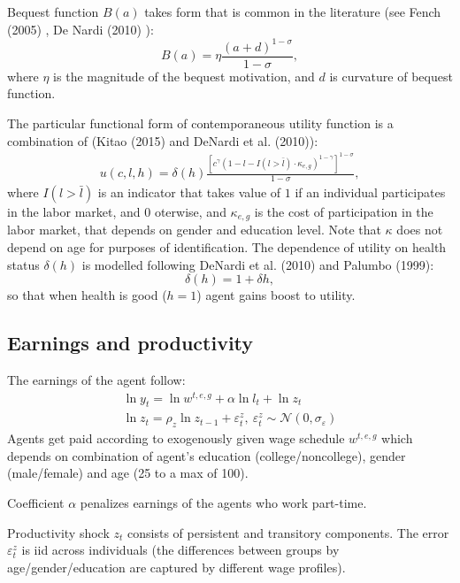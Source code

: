 \documentclass[
10pt, %
a4paper, %
oneside, %
headinclude,footinclude, %
BCOR5mm, %
]{scrartcl}
\begin{document}
Bequest function $B(a)$ takes form that is common in the literature (see Fench (2005) \cite{French2005}, De Nardi (2010) \cite{DeNardi2010}):
\begin{equation}
B(a) = \eta\frac{(a+d)^{1-\sigma}}{1-\sigma},
\end{equation}
where $\eta$ is the magnitude of the bequest motivation, and $d$ is curvature of bequest function.

The particular functional form of contemporaneous utility function  is a combination of (Kitao (2015)\cite{Kitao2015} and DeNardi et al. (2010)\cite{DeNardi2010}):
\begin{eqnarray*}
u(c,l,h) = \delta(h)\frac{[c^{\gamma}(1-l-I(l>\bar{l})\cdot \kappa_{e,g})^{1-\gamma}]^{1-\sigma}}{1-\sigma},
\end{eqnarray*}
where $I(l>\bar{l})$ is an indicator that takes value of $1$ if an individual participates in the labor market, and $0$ oterwise, and $\kappa_{e,g}$ is the cost of participation in the labor market, that depends on gender and education level. Note that $\kappa$ does not depend on age for purposes of identification. The dependence of utility on health status  $\delta(h)$ is modelled following DeNardi et al. (2010)\cite{DeNardi2010} and Palumbo (1999)\cite{Palumbo1999}:
\begin{equation*}
\delta(h) = 1+\delta h,
\end{equation*}
so that when health is good ($h=1$) agent gains boost to utility.

\subsection{Earnings and productivity}
The earnings of the agent follow:
\begin{eqnarray*}
\ln y_t = \ln w^{t,e,g}+\alpha \ln l_t + \ln z_t \\
\ln z_t = \rho_z \ln z_{t-1} +  \varepsilon_t^z, \ \varepsilon_t^z\sim \mathcal{N}(0,\sigma_{\varepsilon})
\end{eqnarray*}
Agents get paid according to exogenously given wage schedule $w^{t,e,g}$ which depends on combination of agent's education (college/noncollege), gender (male/female) and age (25 to a max of 100).

Coefficient $\alpha$ penalizes earnings of the agents who work part-time.

Productivity shock $z_t$ consists of persistent and transitory components. The error $\varepsilon_t^z$ is iid across individuals (the differences between groups by age/gender/education are captured by different wage profiles).
\end{document}
